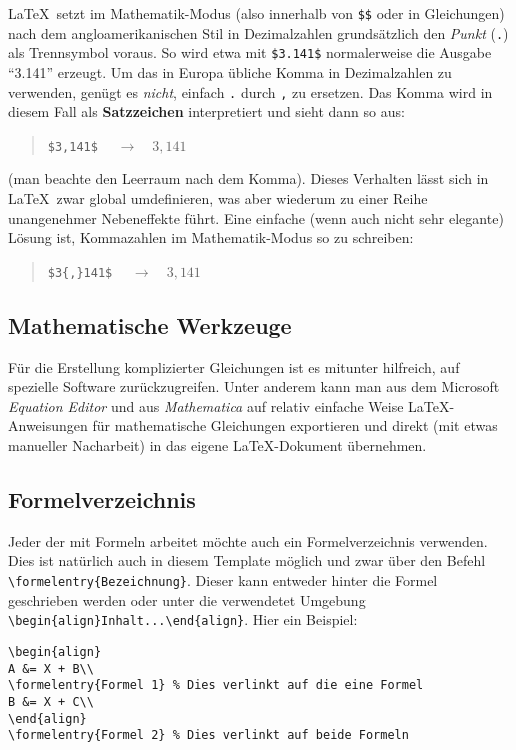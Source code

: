 LaTeX\ setzt im Mathematik-Modus (also innerhalb von \verb!$$! oder in Gleichungen) nach dem angloamerikanischen Stil in Dezimalzahlen grundsätzlich den \emph{Punkt} (\verb!.!) als Trennsymbol voraus. So wird etwa mit \verb!$3.141$! normalerweise die Ausgabe "`3.141"' erzeugt. Um das in Europa übliche Komma in Dezimalzahlen zu verwenden, genügt es \emph{nicht}, einfach \verb!.! durch \verb!,! zu ersetzen. Das Komma wird in diesem Fall
als \textbf{Satzzeichen} interpretiert und sieht dann so aus:
\begin{quote}
\verb!$3,141$!	$\quad \rightarrow \quad 3,141$ 
\end{quote}
(man beachte den Leerraum nach dem Komma). Dieses Verhalten lässt sich in LaTeX\ zwar global umdefinieren, was aber wiederum zu einer Reihe unangenehmer Nebeneffekte führt. Eine einfache (wenn auch nicht sehr elegante) Lösung ist, Kommazahlen im Mathematik-Modus so zu schreiben:
\begin{quote}
\verb!$3{,}141$!	$\quad \rightarrow \quad 3{,}141$
\end{quote}



\subsection{Mathematische Werkzeuge}

Für die Erstellung komplizierter Gleichungen ist es mitunter
hilfreich, auf spezielle Software zurückzugreifen. Unter anderem kann man
aus dem Microsoft \emph{Equation Editor} und aus {\em
Mathematica} auf relativ einfache Weise LaTeX-An\-wei\-sun\-gen
für mathematische Gleichungen exportieren und direkt (mit etwas
manueller Nacharbeit) in das eigene LaTeX-Dokument übernehmen.


\subsection{Formelverzeichnis}

Jeder der mit Formeln arbeitet möchte auch ein Formelverzeichnis verwenden. Dies ist natürlich auch in diesem Template möglich und zwar über den Befehl \verb|\formelentry{Bezeichnung}|. Dieser kann entweder hinter die Formel geschrieben werden oder unter die verwendetet Umgebung \verb|\begin{align}Inhalt...\end{align}|. Hier ein Beispiel:

\begin{lstlisting}[style=LaTeX]
\begin{align}
A &= X + B\\
\formelentry{Formel 1} % Dies verlinkt auf die eine Formel
B &= X + C\\
\end{align}
\formelentry{Formel 2} % Dies verlinkt auf beide Formeln 
\end{lstlisting}

